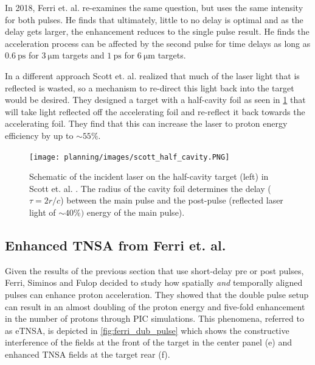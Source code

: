 In 2018, Ferri et. al. \cite{Ferri_2018_PoP} re-examines the same question, but uses the same intensity for both pulses. He finds that ultimately, little to no delay is optimal and as the delay gets larger, the enhancement reduces to the single pulse result. He finds the acceleration process can be affected by the second pulse for time delays as long as $\SI{0.6}{\pico \second}$ for $\SI{3}{\micro \meter}$ targets and $\SI{1}{\pico \second}$ for $\SI{6}{\micro \meter}$ targets. 

In a different approach Scott et. al. \cite{Scott_2012_APL} realized that much of the laser light that is reflected is wasted, so a mechanism to re-direct this light back into the target would be desired. They designed a target with a half-cavity foil as seen in \cref{fig:scott_half_cavity} that will take light reflected off the accelerating foil and re-reflect it back towards the accelerating foil. They find that this can increase the laser to proton energy efficiency by up to $\sim 55 \%$.

\begin{figure}
	\centering 
	\texttt{[image: planning/images/scott\_half\_cavity.PNG]}
	\caption{Schematic of the incident laser on the half-cavity target (left) in Scott et. al. \cite{Scott_2012_APL}. The radius of the cavity foil determines the delay ($\tau = 2 r/c$) between the main pulse and the post-pulse (reflected laser light of $\sim 40 \%)$ energy of the main pulse).}
	\label{fig:scott_half_cavity}
\end{figure}



\subsection{Enhanced TNSA from Ferri et. al.}

Given the results of the previous section \cite{Markey_2010_PRL,Scott_2012_APL,Ferri_2018_PoP} that use short-delay pre or post pulses, Ferri, Siminos and Fulop decided to study how spatially \emph{and} temporally aligned pulses can enhance proton acceleration. They showed that the double pulse setup can result in an almost doubling of the proton energy and five-fold enhancement in the number of protons \cite{Ferri_2019_Nat_Comm} through \gls{PIC} simulations. This phenomena, referred to as \gls{eTNSA}, is depicted in \cref{fig:ferri_dub_pulse} which shows the constructive interference of the fields at the front of the target in the center panel (e) and enhanced \gls{TNSA} fields at the target rear (f).

